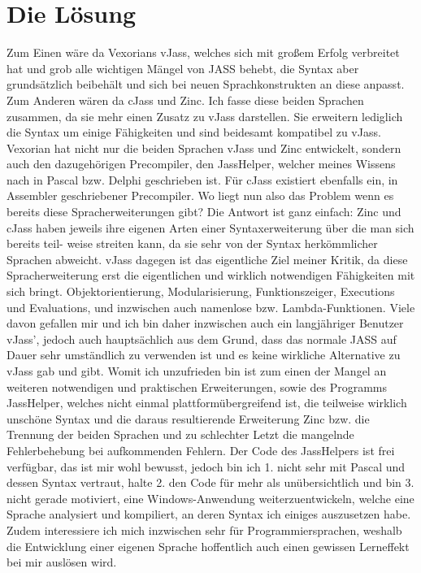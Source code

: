 \section{Die Lösung}
Zum Einen wäre da Vexorians vJass, welches sich mit großem Erfolg verbreitet hat und grob alle wichtigen Mängel von JASS behebt, die
Syntax aber grundsätzlich beibehält und sich bei neuen Sprachkonstrukten an diese anpasst.
Zum Anderen wären da cJass und Zinc. Ich fasse diese beiden Sprachen zusammen, da sie mehr einen Zusatz zu vJass darstellen.
Sie erweitern lediglich die Syntax um einige Fähigkeiten und sind beidesamt kompatibel zu vJass.
Vexorian hat nicht nur die beiden Sprachen vJass und Zinc entwickelt, sondern auch den dazugehörigen Precompiler, den JassHelper,
welcher meines Wissens nach in Pascal bzw. Delphi geschrieben ist.
Für cJass existiert ebenfalls ein, in Assembler geschriebener Precompiler.
Wo liegt nun also das Problem wenn es bereits diese Spracherweiterungen gibt?
Die Antwort ist ganz einfach: Zinc und cJass haben jeweils ihre eigenen Arten einer Syntaxerweiterung über die man sich bereits teil-
weise streiten kann, da sie sehr von der Syntax herkömmlicher Sprachen abweicht.
vJass dagegen ist das eigentliche Ziel meiner Kritik, da diese Spracherweiterung erst die eigentlichen und wirklich notwendigen Fähigkeiten
mit sich bringt. Objektorientierung, Modularisierung, Funktionszeiger, Executions und Evaluations, und inzwischen auch namenlose bzw. Lambda-Funktionen.
Viele davon gefallen mir und ich bin daher inzwischen auch ein langjähriger Benutzer vJass', jedoch auch hauptsächlich aus dem Grund, dass das normale
JASS auf Dauer sehr umständlich zu verwenden ist und es keine wirkliche Alternative zu vJass gab und gibt.
Womit ich unzufrieden bin ist zum einen der Mangel an weiteren notwendigen und praktischen Erweiterungen, sowie des Programms
JassHelper, welches nicht einmal plattformübergreifend ist, die teilweise wirklich unschöne Syntax und die daraus resultierende Erweiterung Zinc bzw.
die Trennung der beiden Sprachen und zu schlechter Letzt die mangelnde Fehlerbehebung bei aufkommenden Fehlern.
Der Code des JassHelpers ist frei verfügbar, das ist mir wohl bewusst, jedoch bin ich 1. nicht sehr mit Pascal und dessen Syntax vertraut, halte 2.
den Code für mehr als unübersichtlich und bin 3. nicht gerade motiviert, eine Windows-Anwendung weiterzuentwickeln, welche eine Sprache analysiert
und kompiliert, an deren Syntax ich einiges auszusetzen habe.
Zudem interessiere ich mich inzwischen sehr für Programmiersprachen, weshalb die Entwicklung einer eigenen Sprache hoffentlich auch einen gewissen
Lerneffekt bei mir auslösen wird.

